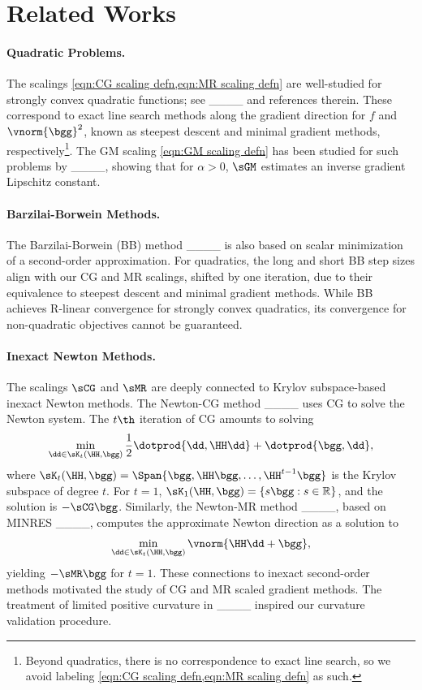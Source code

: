 \section{Related Works}
\label{sec:related_work}
\paragraph{Quadratic Problems.} 
The scalings \cref{eqn:CG scaling defn,eqn:MR scaling defn} are well-studied for strongly convex quadratic functions; see ____ and references therein. These correspond to exact line search methods along the gradient direction for $f$ and $\vnorm{\bgg}^2$, known as steepest descent and minimal gradient methods, respectively\footnote{Beyond quadratics, there is no correspondence to exact line search, so we avoid labeling \cref{eqn:CG scaling defn,eqn:MR scaling defn} as such.}. The GM scaling \cref{eqn:GM scaling defn} has been studied for such problems by ____, showing that for $\alpha > 0$, $\sGM$ estimates an inverse gradient Lipschitz constant.

\vspace{-1mm}
\paragraph{Barzilai-Borwein Methods.} 
The Barzilai-Borwein (BB) method ____ is also based on scalar minimization of a second-order approximation. For quadratics, the long and short BB step sizes align with our CG and MR scalings, shifted by one iteration, due to their equivalence to steepest descent and minimal gradient methods. While BB achieves R-linear convergence for strongly convex quadratics, its convergence for non-quadratic objectives cannot be guaranteed.

\vspace{-1mm}
\paragraph{Inexact Newton Methods.} 
The scalings $\sCG$ and $\sMR$ are deeply connected to Krylov subspace-based inexact Newton methods. The Newton-CG method ____ uses CG to solve the Newton system. The $t\th$ iteration of CG amounts to solving  
\begin{align*}
    \min_{\dd \in \sK_t(\HH, \bgg)} \frac{1}{2}\dotprod{\dd, \HH \dd} + \dotprod{\bgg, \dd},
\end{align*}
where $\sK_t(\HH, \bgg) = \Span \{ \bgg, \HH\bgg, \dots, \HH^{t-1} \bgg \}$ is the Krylov subspace of degree $t$. For $t = 1$, $\sK_1(\HH, \bgg) = \{ s \bgg : s \in \mathbb{R} \}$, and the solution is $-\sCG \bgg$. Similarly, the Newton-MR method ____, based on MINRES ____, computes
the approximate Newton direction as a solution to
\begin{align*}
    \min_{\dd \in \sK_t(\HH, \bgg)} \vnorm{\HH \dd + \bgg},
\end{align*}
yielding $-\sMR \bgg$ for $t = 1$. These connections to inexact second-order methods motivated the study of CG and MR scaled gradient methods. The treatment of limited positive curvature in ____ inspired our curvature validation procedure.

